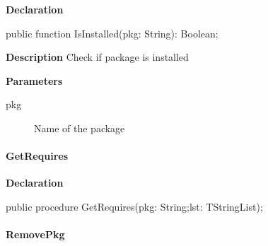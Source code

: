 \documentclass{report}
\newif\ifpdf
\begin{document}
\label{packagekit.TPackageKit-IsInstalled}
\begin{list}{}{
\setlength{\itemindent}{0cm}
\setlength{\listparindent}{0cm}
\setlength{\leftmargin}{\evensidemargin}
\addtolength{\leftmargin}{\tmplength}
\settowidth{\labelsep}{X}
\addtolength{\leftmargin}{\labelsep}
\setlength{\labelwidth}{\tmplength}
}
\item[\textbf{Declaration}\hfill]
\ifpdf
\begin{flushleft}
\fi
\begin{ttfamily}
public function IsInstalled(pkg: String): Boolean;\end{ttfamily}

\ifpdf
\end{flushleft}
\fi

\par
\item[\textbf{Description}]
Check if package is installed \par
\item[\textbf{Parameters}]
\begin{description}
\item[pkg] Name of the package
\end{description}


\end{list}
\paragraph*{GetRequires}\hspace*{\fill}

\label{packagekit.TPackageKit-GetRequires}
\begin{list}{}{
\setlength{\itemindent}{0cm}
\setlength{\listparindent}{0cm}
\setlength{\leftmargin}{\evensidemargin}
\addtolength{\leftmargin}{\tmplength}
\settowidth{\labelsep}{X}
\addtolength{\leftmargin}{\labelsep}
\setlength{\labelwidth}{\tmplength}
}
\item[\textbf{Declaration}\hfill]
\ifpdf
\begin{flushleft}
\fi
\begin{ttfamily}
public procedure GetRequires(pkg: String;lst: TStringList);\end{ttfamily}

\ifpdf
\end{flushleft}
\fi

\end{list}
\paragraph*{RemovePkg}\hspace*{\fill}
\end{document}
